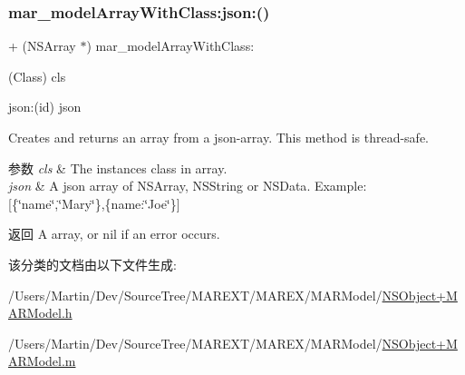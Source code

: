\mbox{\label{category_n_s_array_07_m_a_r_model_08_a0fe4a7681c640cbec42b0c0304c8f240}} 
\subsubsection{\texorpdfstring{mar\+\_\+model\+Array\+With\+Class\+:json\+:()}{mar\_modelArrayWithClass:json:()}}
{\footnotesize\ttfamily + (N\+S\+Array $\ast$) mar\+\_\+model\+Array\+With\+Class\+: \begin{DoxyParamCaption}\item[{(Class)}]{cls }\item[{json:(id)}]{json }\end{DoxyParamCaption}}

Creates and returns an array from a json-\/array. This method is thread-\/safe.


\begin{DoxyParams}{参数}
{\em cls} & The instance\textquotesingle{}s class in array. \\
\hline
{\em json} & A json array of {\ttfamily N\+S\+Array}, {\ttfamily N\+S\+String} or {\ttfamily N\+S\+Data}. Example\+: \mbox{[}\{\char`\"{}name\char`\"{},\char`\"{}\+Mary\char`\"{}\},\{name\+:\char`\"{}\+Joe\char`\"{}\}\mbox{]}\\
\hline
\end{DoxyParams}
\begin{DoxyReturn}{返回}
A array, or nil if an error occurs. 
\end{DoxyReturn}


该分类的文档由以下文件生成\+:\begin{DoxyCompactItemize}
\item 
/\+Users/\+Martin/\+Dev/\+Source\+Tree/\+M\+A\+R\+E\+X\+T/\+M\+A\+R\+E\+X/\+M\+A\+R\+Model/\hyperlink{_n_s_object_09_m_a_r_model_8h}{N\+S\+Object+\+M\+A\+R\+Model.\+h}\item 
/\+Users/\+Martin/\+Dev/\+Source\+Tree/\+M\+A\+R\+E\+X\+T/\+M\+A\+R\+E\+X/\+M\+A\+R\+Model/\hyperlink{_n_s_object_09_m_a_r_model_8m}{N\+S\+Object+\+M\+A\+R\+Model.\+m}\end{DoxyCompactItemize}
